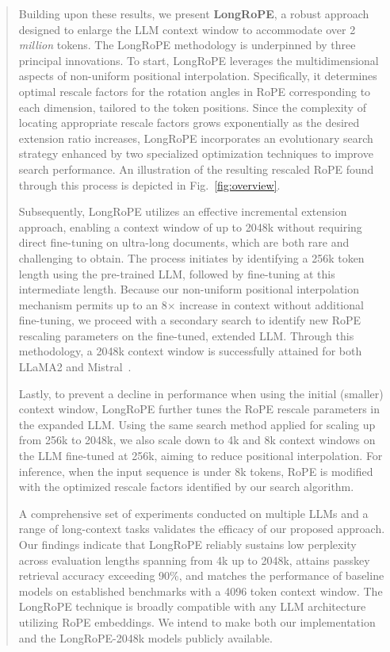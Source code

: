 \begin{abstract}
Building upon these results, we present \textbf{LongRoPE}, a robust approach designed to enlarge the LLM context window to accommodate over 2 \emph{million} tokens. The LongRoPE methodology is underpinned by three principal innovations. To start, {LongRoPE} leverages the multidimensional aspects of non-uniform positional interpolation. Specifically, it determines optimal rescale factors for the rotation angles in RoPE corresponding to each dimension, tailored to the token positions. Since the complexity of locating appropriate rescale factors grows exponentially as the desired extension ratio increases, {LongRoPE} incorporates an evolutionary search strategy enhanced by two specialized optimization techniques to improve search performance. An illustration of the resulting rescaled RoPE found through this process is depicted in Fig.~\ref{fig:overview}.

Subsequently, {LongRoPE} utilizes an effective incremental extension approach, enabling a context window of up to 2048k without requiring direct fine-tuning on ultra-long documents, which are both rare and challenging to obtain. The process initiates by identifying a 256k token length using the pre-trained LLM, followed by fine-tuning at this intermediate length. Because our non-uniform positional interpolation mechanism permits up to an 8$\times$ increase in context without additional fine-tuning, we proceed with a secondary search to identify new RoPE rescaling parameters on the fine-tuned, extended LLM. Through this methodology, a 2048k context window is successfully attained for both LLaMA2 and Mistral~\cite{mistral}.

Lastly, to prevent a decline in performance when using the initial (smaller) context window, {LongRoPE} further tunes the RoPE rescale parameters in the expanded LLM. Using the same search method applied for scaling up from 256k to 2048k, we also scale down to 4k and 8k context windows on the LLM fine-tuned at 256k, aiming to reduce positional interpolation. For inference, when the input sequence is under 8k tokens, RoPE is modified with the optimized rescale factors identified by our search algorithm.

A comprehensive set of experiments conducted on multiple LLMs and a range of long-context tasks validates the efficacy of our proposed approach. Our findings indicate that LongRoPE reliably sustains low perplexity across evaluation lengths spanning from 4k up to 2048k, attains passkey retrieval accuracy exceeding 90\%, and matches the performance of baseline models on established benchmarks with a 4096 token context window. The LongRoPE technique is broadly compatible with any LLM architecture utilizing RoPE embeddings. We intend to make both our implementation and the LongRoPE-2048k models publicly available.


\end{abstract}
